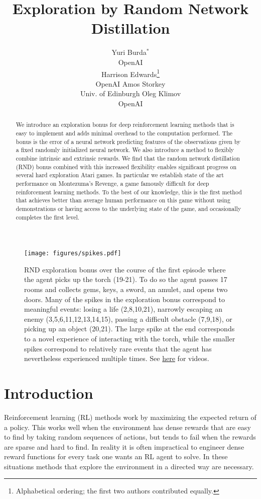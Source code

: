 \documentclass{article} \usepackage[dvipsnames]{xcolor}
\title{Exploration by Random Network Distillation}
\author{Yuri Burda$^\ast$\\
OpenAI\\
\And
Harrison Edwards\thanks{Alphabetical ordering; the first two authors contributed equally.}\\
OpenAI
\And
Amos Storkey\\
Univ. of Edinburgh
\And
Oleg Klimov\\
OpenAI
}
\begin{document}
\maketitle

\begin{abstract}
We introduce an exploration bonus for deep reinforcement learning methods that is easy to implement and adds minimal overhead to the computation performed. The bonus is the error of a neural network predicting features of the observations given by a fixed randomly initialized neural network. We also introduce a method to flexibly combine intrinsic and extrinsic rewards. We find that the random network distillation (RND) bonus combined with this increased flexibility enables significant progress on several hard exploration Atari games. In particular we establish state of the art performance on Montezuma's Revenge, a game famously difficult for deep reinforcement learning methods. To the best of our knowledge, this is the first method that achieves better than average human performance on this game without using demonstrations or having access to the underlying state of the game, and occasionally completes the first level.\end{abstract}

\begin{figure}[!b]
\vspace*{-8pt}
\centering
\texttt{[image: figures/spikes.pdf]}
\caption{RND exploration bonus over the course of the first episode where the agent picks up the torch (19-21). To do so the agent passes 17 rooms and collects gems, keys, a sword, an amulet, and opens two doors. Many of the spikes in the exploration bonus correspond to meaningful events: losing a life (2,8,10,21), narrowly escaping an enemy (3,5,6,11,12,13,14,15),  passing a difficult obstacle (7,9,18), or picking up an object (20,21). The large spike at the end corresponds to a novel experience of interacting with the torch, while the smaller spikes correspond to relatively rare events that the agent has nevertheless experienced multiple times.  See \href{https://github.com/openai/random-network-distillation}{here} for videos.}
\label{fig:spikes}
\end{figure}


\section{Introduction}
Reinforcement learning (RL) methods work by maximizing the expected return of a policy. This works well when the environment has dense rewards that are easy to find by taking random sequences of actions, but tends to fail when the rewards are sparse and hard to find. In reality it is often impractical to engineer dense reward functions for every task one wants an RL agent to solve. In these situations methods that explore the environment in a directed way are necessary.
\end{document}
